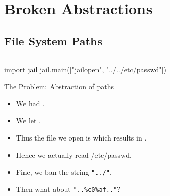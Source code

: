 \section{Broken Abstractions}

\subsection{File System Paths}

\begin{frame}[fragile]
  \inputminted{python}{jail.py}
\end{frame}

\begin{frame}[fragile]
  \begin{example}
    \begin{pycode}
import jail
jail.main(["jailopen", "../../etc/passwd"])
    \end{pycode}
  \end{example}
\end{frame}

\begin{frame}
  \begin{alertblock}{The Problem: Abstraction of paths}
    \begin{itemize}
      \item We had .
      \item We let .
      \item Thus the file we open is  
        which results in .
      \item Hence we actually read /etc/passwd.
    \end{itemize}
  \end{alertblock}
\end{frame}

\begin{frame}
  \begin{itemize}
    \item Fine, we ban the string \texttt{"../"}.

    \item Then what about \texttt{"..\%c0\%af.."}?

  \end{itemize}
\end{frame}

